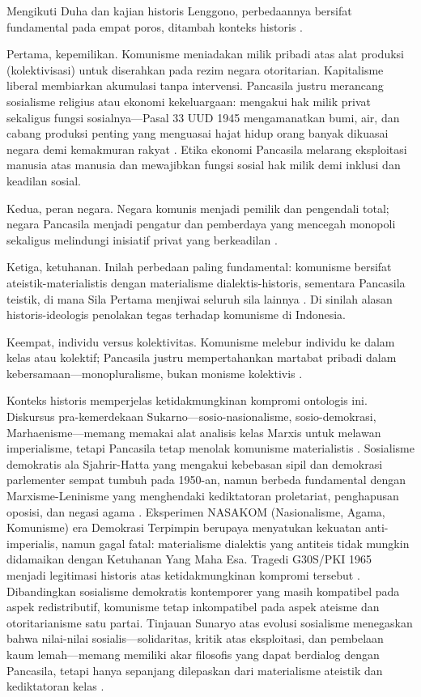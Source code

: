 \documentclass[journal]{IEEEtran}
\begin{document}
Mengikuti Duha dan kajian historis Lenggono, perbedaannya bersifat fundamental pada empat poros, ditambah konteks historis \cite{duha2022,lenggono2021}.

Pertama, kepemilikan. Komunisme meniadakan milik pribadi atas alat produksi (kolektivisasi) untuk diserahkan pada rezim negara otoritarian. Kapitalisme liberal membiarkan akumulasi tanpa intervensi. Pancasila justru merancang sosialisme religius atau ekonomi kekeluargaan: mengakui hak milik privat sekaligus fungsi sosialnya---Pasal 33 UUD 1945 mengamanatkan bumi, air, dan cabang produksi penting yang menguasai hajat hidup orang banyak dikuasai negara demi kemakmuran rakyat \cite{uud1945,hatta1977,duha2022}. Etika ekonomi Pancasila melarang eksploitasi manusia atas manusia dan mewajibkan fungsi sosial hak milik demi inklusi dan keadilan sosial.

Kedua, peran negara. Negara komunis menjadi pemilik dan pengendali total; negara Pancasila menjadi pengatur dan pemberdaya yang mencegah monopoli sekaligus melindungi inisiatif privat yang berkeadilan \cite{duha2022,hatta1977}.

Ketiga, ketuhanan. Inilah perbedaan paling fundamental: komunisme bersifat ateistik-materialistis dengan materialisme dialektis-historis, sementara Pancasila teistik, di mana Sila Pertama menjiwai seluruh sila lainnya \cite{latif2018,pristiwiyanto2021,duha2022}. Di sinilah alasan historis-ideologis penolakan tegas terhadap komunisme di Indonesia.

Keempat, individu versus kolektivitas. Komunisme melebur individu ke dalam kelas atau kolektif; Pancasila justru mempertahankan martabat pribadi dalam kebersamaan---monopluralisme, bukan monisme kolektivis \cite{notonagoro1975,pristiwiyanto2021}.

Konteks historis memperjelas ketidakmungkinan kompromi ontologis ini. Diskursus pra-kemerdekaan Sukarno---sosio-nasionalisme, sosio-demokrasi, Marhaenisme---memang memakai alat analisis kelas Marxis untuk melawan imperialisme, tetapi Pancasila tetap menolak komunisme materialistis \cite{latif2018,soekarno1964,lenggono2021}. Sosialisme demokratis ala Sjahrir-Hatta yang mengakui kebebasan sipil dan demokrasi parlementer sempat tumbuh pada 1950-an, namun berbeda fundamental dengan Marxisme-Leninisme yang menghendaki kediktatoran proletariat, penghapusan oposisi, dan negasi agama \cite{hatta1977}. Eksperimen NASAKOM (Nasionalisme, Agama, Komunisme) era Demokrasi Terpimpin berupaya menyatukan kekuatan anti-imperialis, namun gagal fatal: materialisme dialektis yang antiteis tidak mungkin didamaikan dengan Ketuhanan Yang Maha Esa. Tragedi G30S/PKI 1965 menjadi legitimasi historis atas ketidakmungkinan kompromi tersebut \cite{lenggono2021,duha2022}. Dibandingkan sosialisme demokratis kontemporer yang masih kompatibel pada aspek redistributif, komunisme tetap inkompatibel pada aspek ateisme dan otoritarianisme satu partai. Tinjauan Sunaryo atas evolusi sosialisme menegaskan bahwa nilai-nilai sosialis---solidaritas, kritik atas eksploitasi, dan pembelaan kaum lemah---memang memiliki akar filosofis yang dapat berdialog dengan Pancasila, tetapi hanya sepanjang dilepaskan dari materialisme ateistik dan kediktatoran kelas \cite{sunaryo2023,hatta1977}.
\end{document}
